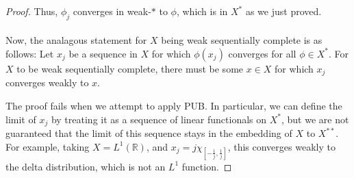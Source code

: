 \documentclass[fontsize=11pt]{scrartcl} %
\numberwithin{equation}{section} %
\numberwithin{figure}{section} %
\numberwithin{table}{section} %
\newcommand{\R}{\mathbb{R}}
\begin{document}
\begin{proof}
    Thus, $\phi_j$ converges in weak-$*$ to $\phi$, which is in $X^*$ as we just
    proved.
    \\
    \\
    Now, the analagous statement for $X$ being weak sequentially complete is as
    follows:
    Let $x_j$ be a sequence in $X$ for which $\phi(x_j)$ converges for all
    $\phi\in X^*$. For $X$ to be weak sequentially complete, there must be some
    $x\in X$ for which $x_j$ converges weakly to $x$.

    The proof fails when we attempt to apply PUB. In particular, we can define
    the limit of $x_j$ by treating it as a sequence of linear functionals on
    $X^*$, but we are not guaranteed that the limit of this sequence stays in
    the embedding of $X$ to $X^{**}$. For example, taking $X = L^1(\R)$, and
    $x_j = j\chi_{[-\frac{1}{j},\frac{1}{j}]}$, this converges weakly to the
    delta distribution, which is not an $L^1$ function.
\end{proof}

\newpage
\end{document}
